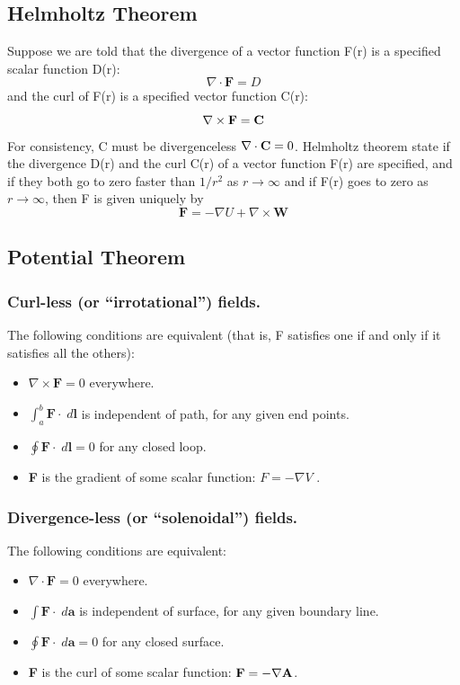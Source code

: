 \documentclass[../main.tex]{subfiles}
\begin{document}
\subsection{Helmholtz Theorem}
Suppose we are told that the divergence of a vector function F(r) is a specified
scalar function D(r):
\begin{equation*}
    \nabla \cdot \mathbf{F}=D
\end{equation*}
and the curl of F(r) is a speciﬁed vector function C(r):
\begin{equation*}
    \nabla \times \mathbf{F}=\mathbf{C}
\end{equation*}
For consistency, C must be divergenceless $\nabla \cdot \mathbf{C}=0$. 
Helmholtz theorem state if the divergence D(r) and the curl C(r) 
of a vector function F(r) are speciﬁed, 
and if they both go to zero faster than $1/r^2$ as $ r \rightarrow \infty$
and if F(r)
goes to zero as $ r \rightarrow \infty$, 
then F is given uniquely by
\begin{equation*}
    \mathbf{F} =-\nabla U+\nabla \times \mathbf{W}
\end{equation*}

\subsection{Potential Theorem}
\subsubsection{Curl-less (or “irrotational”) fields.} 
The following conditions are equivalent
(that is, F satisﬁes one if and only if it satisﬁes all the others):
\begin{itemize}
    \item $\nabla \times \mathbf{F}=0$ everywhere.
    \item  $\int_{a}^{b}\mathbf{F}\cdot\;d\mathbf{l}$ is independent of path, for any given end points.
    \item $\oint\mathbf{F} \cdot\;d\mathbf{l}=0$ for any closed loop.
    \item \textbf{F} is the gradient of some scalar function: $F =- \nabla V$ .
\end{itemize}

\subsubsection{Divergence-less (or “solenoidal”) fields.} 
The following conditions are equivalent:
\begin{itemize}
    \item $\nabla \cdot \mathbf{F}=0$ everywhere.
    \item  $\int\mathbf{F}\cdot\;d\mathbf{a}$ is independent of surface, for any given boundary line.
    \item $\oint\mathbf{F} \cdot\;d\mathbf{a}=0$ for any closed surface.
    \item \textbf{F} is the curl  of some scalar function: $\mathbf{F} =- \nabla \mathbf{A}$.
\end{itemize}
\end{document}

